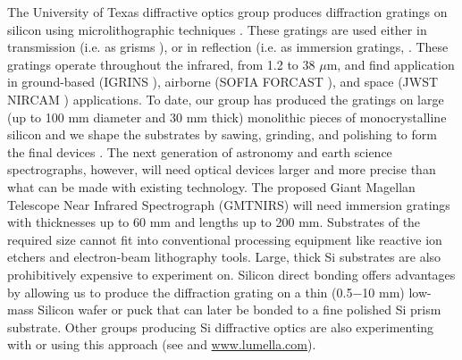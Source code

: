 \documentclass[osajnl,preprint,showpacs,superscriptaddress,12pt]{revtex4-1} %
\begin{document}

The University of Texas diffractive optics group produces diffraction gratings on silicon using microlithographic techniques \cite{1998SPIE.3354..201J,2010SPIE.7739E.146W}.  These gratings are used either in transmission (i.e. as grisms \cite{2008SPIE.7014E..77D, 2010SPIE.7739E.123G}), or in reflection (i.e. as immersion gratings, \cite{2007ApOpt..46.3400M, 2010SPIE.7739E.146W,2012SPIE.8450E..2SG}.  These gratings operate throughout the infrared, from 1.2 to 38 $\mu$m, and find application in ground-based (IGRINS \cite{2010SPIE.7735E..54Y, 2012SPIE.8450E..2SG}), airborne (SOFIA FORCAST \cite{2008SPIE.7014E..77D}), and space (JWST NIRCAM \cite{2005SPIE.5904...21B,2010SPIE.7739E.123G}) applications.  To date, our group has produced the gratings on large (up to 100 mm diameter and 30 mm thick) monolithic pieces of monocrystalline silicon and we shape the substrates by sawing, grinding, and polishing to form the final devices \cite{2010SPIE.7739E.146W}.  The next generation of astronomy and earth science spectrographs, however, will need optical devices larger and more precise than what can be made with existing technology.  The proposed Giant Magellan Telescope \cite{2012SPIE.8444E..1HJ} Near Infrared Spectrograph \cite{2006SPIE.6269E.143J,2010SPIE.7735E..87L} (GMTNIRS) will need immersion gratings with thicknesses up to 60 mm and lengths up to 200 mm.  Substrates of the required size cannot fit into conventional processing equipment like reactive ion etchers and electron-beam lithography tools.  Large, thick Si substrates are also prohibitively expensive to experiment on.  Silicon direct bonding \cite{1986JAP....60.2987S,2012SPIE.8450E..2TV} offers advantages by allowing us to produce the diffraction grating on a thin (0.5$-$10 mm) low-mass Silicon wafer or puck that can later be bonded to a fine polished Si prism substrate.  Other groups producing Si diffractive optics are also experimenting with or using this approach (see \cite{2012SPIE.8450E..2TV} and \url{www.lumella.com}).
\end{document}
